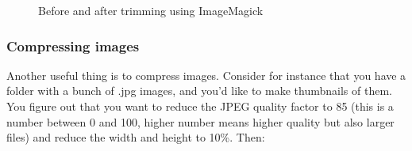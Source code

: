 \begin{figure}
	\begin{minipage}[b]{0.5\linewidth}
		\centering
		{%
			\setlength{\fboxsep}{0pt}%
		}%
	\end{minipage}%
	\begin{minipage}[b]{0.5\linewidth}
		\centering
		{%
			\setlength{\fboxsep}{0pt}%
		}%
	\end{minipage}%
	\caption{Before and after trimming using ImageMagick}
	\label{fig:bash:trim}
\end{figure}

\subsubsection{Compressing images}
Another useful thing is to compress images. Consider for instance that you have a folder with a bunch of .jpg images, and you'd like to make thumbnails of them. You figure out that you want to reduce the JPEG quality factor to 85 (this is a number between 0 and 100, higher number means higher quality but also larger files) and reduce the width and height to 10\%. Then:

